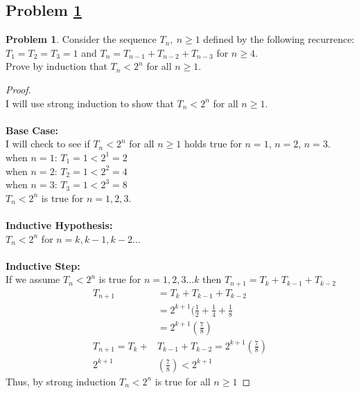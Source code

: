 \documentclass[11pt]{article}
\theoremstyle{definition}
\theoremstyle{definition}
\newtheorem{required}{Problem}
\theoremstyle{definition}
\begin{document}
\newpage
\subsection{Problem \ref{Induction2}} 
\begin{required} \label{Induction2}
Consider the sequence $T_n,~n\geq 1$ defined by the following recurrence: $T_1=T_2=T_3=1$ and $T_n=T_{n-1}+T_{n-2}+T_{n-3}$ for $n\geq 4$. \\

\noindent Prove by induction that $T_{n} < 2^n$ for all $n\geq 1$. 
\end{required}

\begin{proof}
\\
I will use strong induction to show that $T_{n} < 2^n$ for all $n\geq 1$.
\\
\\
\textbf{Base Case:}
\\
I will check to see if  $T_{n} < 2^n$ for all $n\geq 1$ holds true for $n = 1$, $n = 2$, $n = 3$.
\\
when $n=1$: $T_{1} = 1 < 2^{1} = 2$
\\
when $n=2$: $T_{2} = 1 < 2^{2} = 4$
\\
when $n=3$: $T_{3} = 1 < 2^{3} = 8$
\\
 $T_{n} < 2^n$ is true for $n = 1, 2, 3$.
 \\
 \\
 \textbf{Inductive Hypothesis:}
 \\
  $T_{n} < 2^n$ for $n = k, k-1, k-2...$
\\
\\
\textbf{Inductive Step:}
\\
If we assume  $T_{n} < 2^n$ is true for $n = 1, 2, 3...k$ then $T_{n+1} = T_{k} + T_{k-1} +T_{k-2}$
\\
\begin{align*}
T_{n+1} &= T_{k} + T_{k-1} +T_{k-2} \\ 
&=2^{k+1}(\frac{1}{2} + \frac{1}{4} + \frac{1}{8} \\ 
&=2^{k+1}(\frac{7}{8}) \\
T_{n+1} = T_{k} + &T_{k-1} +T_{k-2} = 2^{k+1}(\frac{7}{8})\\
2^{k+1}&(\frac{7}{8}) < 2^{k+1}
\end{align*}
Thus, by strong induction $T_{n} < 2^n$ is true for all $n \geq 1$

\end{proof}
\end{document}
